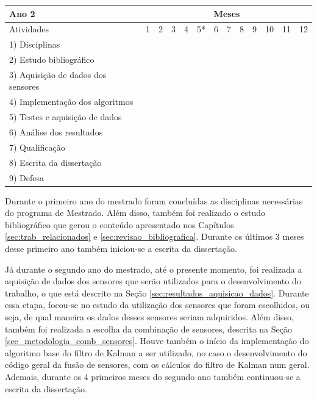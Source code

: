 \documentclass[acronym, symbols, table]{fei}
\begin{document}
\begin{table}[!htb]
			\begin{tabular}{>{\raggedright}p{}|c|c|c|c|c|c|c|c|c|c|c|c|}
				\cline{2-13}
				Ano 2 & \multicolumn{12}{c|}{Meses} \\ \hline
				Atividades                       				 & 1 &  2 &  3 &  4 &  5* &  6 &  7 &  8 &  9 & 10 & 11 & 12 \\ \hline \hline
				\small 1) Disciplinas   			 			 &    &    &    &    &    &    &    &    &    &    &    &    \\ \hline
				\small 2) Estudo bibliográfico   				 & \X & \X & \X & \X & \X &    &    &    &    &    &    &    \\ \hline
				\small 3) Aquisição de dados dos sensores        & \X & \X &    &    &    &    &    &    &    &    &    &    \\ \hline
				\small 4) Implementação dos algoritmos  	 	 &    &    & \X & \X & \X & \X & \X & \X &    &    &    &    \\ \hline
				\small 5) Testes e aquisição de dados   		 &    &    &    &    & \X & \X & \X & \X & \X & \X &    &    \\ \hline
				\small 6) Análise dos resultados   			 	 &    &    &    &    &    & \X & \X & \X & \X & \X &    &    \\ \hline
				\small 7) Qualificação   			 	 		 &    &    &    &    & \X &    &    &    &    &    &    &    \\ \hline
				\small 8) Escrita da dissertação   				 & \X & \X & \X & \X &    &    &    &    & \X & \X & \X & \X \\ \hline
				\small 9) Defesa    				 			 &    &    &    &    &    &    &    &    &    &    &    & \X \\ \hline \hline				
			\end{tabular}
		\end{table}
		
		Durante o primeiro ano do mestrado foram concluídas as disciplinas necessárias do programa de Mestrado. Além disso, também foi realizado o estudo bibliográfico que gerou o conteúdo apresentado nos Capítulos \ref{sec:trab_relacionados} e \ref{sec:revisao_bibliografica}. Durante os últimos 3 meses desse primeiro ano também iniciou-se a escrita da dissertação.
		
		Já durante o segundo ano do mestrado, até o presente momento, foi realizada a aquisição de dados dos sensores que serão utilizados para o desenvolvimento do trabalho, o que está descrito na Seção \ref{sec:resultados_aquisicao_dados}. Durante essa etapa, focou-se no estudo da utilização dos sensores que foram escolhidos, ou seja, de qual maneira os dados desses sensores seriam adquiridos. Além disso, também foi realizada a escolha da combinação de sensores, descrita na Seção \ref{sec_metodologia_comb_sensores}. Houve também o início da implementação do algoritmo base do filtro de Kalman a ser utilizado, no caso o desenvolvimento do código geral da fusão de sensores, com os cálculos do filtro de Kalman num geral. Ademais, durante os 4 primeiros meses do segundo ano também continuou-se a escrita da dissertação.
		
\end{document}
